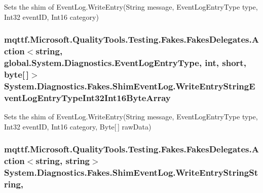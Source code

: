 Sets the shim of Event\-Log.\-Write\-Entry(\-String message, Event\-Log\-Entry\-Type type, Int32 event\-I\-D, Int16 category)

\hypertarget{class_system_1_1_diagnostics_1_1_fakes_1_1_shim_event_log_aaaa284abcdd1284cef19190278427598}{
\subsubsection[{Write\-Entry\-String\-Event\-Log\-Entry\-Type\-Int32\-Int16\-Byte\-Array}]{\setlength{\rightskip}{0pt plus 5cm}mqttf.\-Microsoft.\-Quality\-Tools.\-Testing.\-Fakes.\-Fakes\-Delegates.\-Action$<$string, global.\-System.\-Diagnostics.\-Event\-Log\-Entry\-Type, int, short, byte\mbox{[}$\,$\mbox{]}$>$ System.\-Diagnostics.\-Fakes.\-Shim\-Event\-Log.\-Write\-Entry\-String\-Event\-Log\-Entry\-Type\-Int32\-Int16\-Byte\-Array\hspace{0.3cm}{\ttfamily [set]}}}\label{class_system_1_1_diagnostics_1_1_fakes_1_1_shim_event_log_aaaa284abcdd1284cef19190278427598}


Sets the shim of Event\-Log.\-Write\-Entry(\-String message, Event\-Log\-Entry\-Type type, Int32 event\-I\-D, Int16 category, Byte\mbox{[}$\,$\mbox{]} raw\-Data)

\hypertarget{class_system_1_1_diagnostics_1_1_fakes_1_1_shim_event_log_a9dee6ea75ff44d6685a32bbd77bb4b8b}{
\subsubsection[{Write\-Entry\-String\-String}]{\setlength{\rightskip}{0pt plus 5cm}mqttf.\-Microsoft.\-Quality\-Tools.\-Testing.\-Fakes.\-Fakes\-Delegates.\-Action$<$string, string$>$ System.\-Diagnostics.\-Fakes.\-Shim\-Event\-Log.\-Write\-Entry\-String\-String\hspace{0.3cm}{\ttfamily [static]}, {\ttfamily [set]}}}\label{class_system_1_1_diagnostics_1_1_fakes_1_1_shim_event_log_a9dee6ea75ff44d6685a32bbd77bb4b8b}


